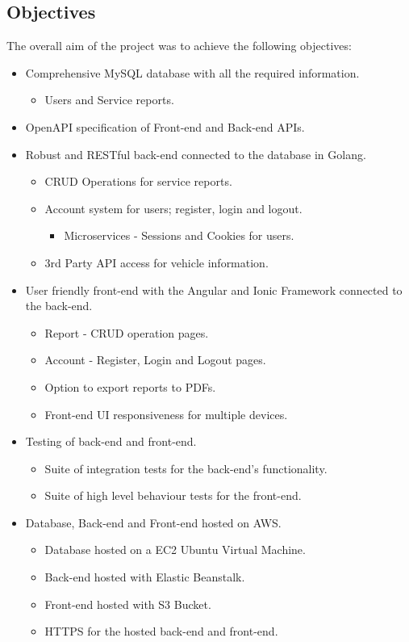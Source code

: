\subsection{Objectives}
The overall aim of the project was to achieve the following objectives: 
\begin{itemize}
    \item Comprehensive MySQL database with all the required information.
     \begin{itemize} 
        \item Users and Service reports.
    \end{itemize}
    \item OpenAPI specification of Front-end and Back-end APIs.
    \item Robust and RESTful back-end connected to the database in Golang.
    \begin{itemize} 
        \item CRUD Operations for service reports.
        \item Account system for users; register, login and logout.
        \begin{itemize} 
            \item Microservices - Sessions and Cookies for users.
        \end{itemize}
        \item 3rd Party API access for vehicle information.
    \end{itemize}
    \item User friendly front-end with the Angular and Ionic Framework connected to the back-end.
    \begin{itemize} 
        \item Report - CRUD operation pages.
        \item Account - Register, Login and Logout pages.
        \item Option to export reports to PDFs.
        \item Front-end UI responsiveness for multiple devices.
    \end{itemize}
    \item Testing of back-end and front-end.
    \begin{itemize}
        \item Suite of integration tests for the back-end's functionality.
        \item Suite of high level behaviour tests for the front-end.
    \end{itemize}
    \item Database, Back-end and Front-end hosted on AWS.
    \begin{itemize} 
        \item Database hosted on a EC2 Ubuntu Virtual Machine.
        \item Back-end hosted with Elastic Beanstalk.
        \item Front-end hosted with S3 Bucket.
        \item HTTPS for the hosted back-end and front-end.
    \end{itemize}
\end{itemize}

